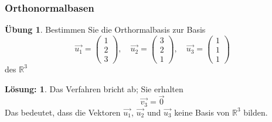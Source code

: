 \documentclass[hyperref={pdfpagelabels=false}]{beamer}
\theoremstyle{plain}%
\theoremstyle{definition}
\newtheorem*{uebung}{Übung}
\newtheorem*{sol}{Lösung:}
\theoremstyle{remark}
\def \R{\mathbb R}
\newcommand{\vektor}[1]{\overrightarrow{#1}}
\begin{document}
\begin{frame}
\frametitle{Orthonormalbasen}

\begin{uebung}
Bestimmen Sie die Orthormalbasis zur Basis 
  	$$ \vektor{u_1} = \left( \begin{matrix} 1 \\ 2 \\ 3 \end{matrix} \right), \quad 
   	\vektor{u_2} = \left( \begin{matrix} 3 \\ 2 \\ 1 \end{matrix} \right), \quad 
   	\vektor{u_3} = \left( \begin{matrix} 1 \\ 1\\ 1 \end{matrix} \right)  $$
des $\R^3$
\end{uebung}

\pause \pause 

\begin{sol}
Das Verfahren bricht ab; Sie erhalten
  	$$ \vektor{v_3} = \vektor{0}  $$
Das bedeutet, dass die Vektoren $\vektor{u_1}$, $\vektor{u_2}$ und $\vektor{u_3}$ keine 
Basis von $\R^3$ bilden. 
\end{sol}

\end{frame}
\end{document}
